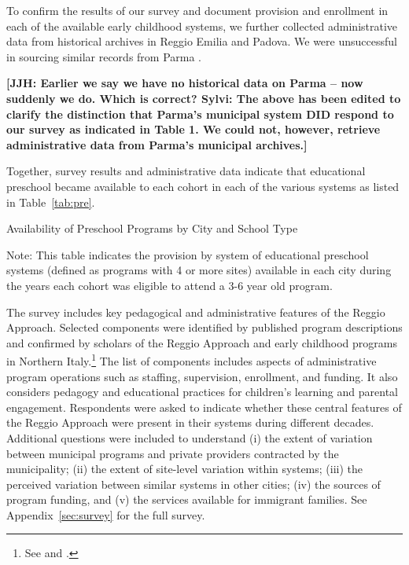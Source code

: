 To confirm the results of our survey and document provision and enrollment in each of the available early childhood systems, we further collected administrative data from historical archives in Reggio Emilia and Padova. We were unsuccessful in sourcing similar records from Parma \citep{Padova-Admin-Data_1964-2011,Reggio-Admin-data_1966-2006,Reggio-Annual-Journals_1994-2011}. 

\textbf{[JJH: Earlier we say we have no historical data on Parma -- now suddenly we do. Which is correct? Sylvi: The above has been edited to clarify the distinction that Parma's municipal system DID respond to our survey as indicated in Table 1. We could not, however, retrieve administrative data from Parma's municipal archives.]}

Together, survey results and administrative data indicate that educational preschool became available to each cohort in each of the various systems as listed in Table~\ref{tab:pre}. 

\begin{table}[H]
\centering
\caption{Availability of Preschool Programs by City and School Type}\label{tab:pre}
\begin{adjustbox}{width=\textwidth}
\begin{threeparttable}
	
\begin{tablenotes}
Note: This table indicates the provision by system of educational preschool systems (defined as programs with 4 or more sites) available in each city during the years each cohort was eligible to attend a 3-6 year old program. 
\end{tablenotes}
\end{threeparttable}
\end{adjustbox}
\end{table}

The survey includes key pedagogical and administrative features of the Reggio Approach. Selected components were identified by published program descriptions and confirmed by scholars of the Reggio Approach and early childhood programs in Northern Italy.\footnote{See \citet{Edwards-etal-eds_1998_Hundred-Languages} and \citet{Corsaro_2008_Policy-Practice}.} The list of components includes aspects of administrative program operations such as staffing, supervision, enrollment, and funding. It also considers pedagogy and educational practices for children's learning and parental engagement. Respondents were asked to indicate whether these central features of the Reggio Approach were present in their systems during different decades. Additional questions were included to understand (i) the extent of variation between municipal programs and private providers contracted by the municipality; (ii) the extent of site-level variation within systems; (iii) the perceived variation between similar systems in other cities; (iv) the sources of program funding, and (v) the services available for immigrant families. See Appendix~\ref{sec:survey} for the full survey. 

